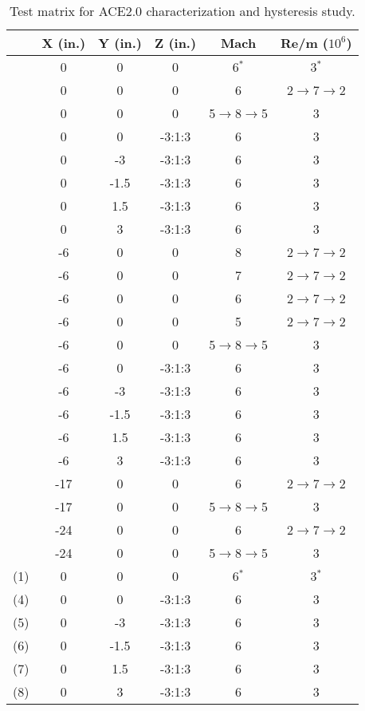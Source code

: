 \setcounter{rownum}{0}
\begin{table}[ht!]
    \centering
    \begin{tabular}{|>{\stepcounter{rownum}\therownum}c|c|c|c|c|c|}
        \hline
        \multicolumn{1}{|c|}{\textbf{Run}} & \textbf{X (in.)} & \textbf{Y (in.)} & \textbf{Z (in.)} & \textbf{Mach} & \textbf{Re/m ($10^6$)} \\ \hline
        & 0 & 0 & 0 & 6$^*$ & 3$^*$ \\ \hline
        & 0 & 0 & 0 & 6 & 2$\to$7$\to$2 \\ \hline
        & 0 & 0 & 0 & 5$\to$8$\to$5 & 3 \\ \hline
        & 0 & 0 & -3:1:3 & 6 & 3 \\ \hline
        & 0 & -3 & -3:1:3 & 6 & 3 \\ \hline
        & 0 & -1.5 & -3:1:3 & 6 & 3 \\ \hline
        & 0 & 1.5 & -3:1:3 & 6 & 3 \\ \hline
        & 0 & 3 & -3:1:3 & 6 & 3 \\ \hline
        & -6 & 0 & 0 & 8 & 2$\to$7$\to$2 \\ \hline
        & -6 & 0 & 0 & 7 & 2$\to$7$\to$2 \\ \hline
        & -6 & 0 & 0 & 6 & 2$\to$7$\to$2 \\ \hline
        & -6 & 0 & 0 & 5 & 2$\to$7$\to$2 \\ \hline
        & -6 & 0 & 0 & 5$\to$8$\to$5 & 3 \\ \hline
        & -6 & 0 & -3:1:3 & 6 & 3 \\ \hline
        & -6 & -3 & -3:1:3 & 6 & 3 \\ \hline
        & -6 & -1.5 & -3:1:3 & 6 & 3 \\ \hline
        & -6 & 1.5 & -3:1:3 & 6 & 3 \\ \hline
        & -6 & 3 & -3:1:3 & 6 & 3 \\ \hline
        & -17 & 0 & 0 & 6 & 2$\to$7$\to$2 \\ \hline
        & -17 & 0 & 0 & 5$\to$8$\to$5 & 3 \\ \hline
        & -24 & 0 & 0 & 6 & 2$\to$7$\to$2 \\ \hline
        & -24 & 0 & 0 & 5$\to$8$\to$5 & 3 \\ \hline
        (1) & 0 & 0 & 0 & 6$^*$ & 3$^*$ \\ \hline
        (4) & 0 & 0 & -3:1:3 & 6 & 3 \\ \hline
        (5) & 0 & -3 & -3:1:3 & 6 & 3 \\ \hline
        (6) & 0 & -1.5 & -3:1:3 & 6 & 3 \\ \hline
        (7) & 0 & 1.5 & -3:1:3 & 6 & 3 \\ \hline
        (8) & 0 & 3 & -3:1:3 & 6 & 3 \\ \hline
    \end{tabular}
    \caption{Test matrix for ACE2.0 characterization and hysteresis study.}
    \label{tab:ace2-survey}
\end{table}

